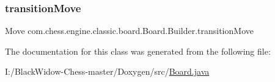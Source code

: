 \subsubsection{\texorpdfstring{transitionMove}{transitionMove}}
{\footnotesize\ttfamily Move com.\+chess.\+engine.\+classic.\+board.\+Board.\+Builder.\+transition\+Move\hspace{0.3cm}{\ttfamily [package]}}



The documentation for this class was generated from the following file\+:\begin{DoxyCompactItemize}
\item 
I\+:/\+Black\+Widow-\/\+Chess-\/master/\+Doxygen/src/\mbox{\hyperlink{_board_8java}{Board.\+java}}\end{DoxyCompactItemize}
